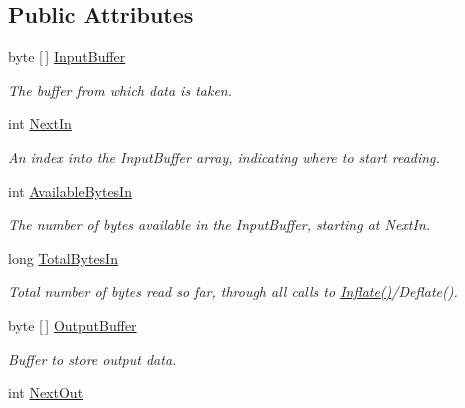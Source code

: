 \subsection*{Public Attributes}
\begin{DoxyCompactItemize}
\item 
byte \mbox{[}$\,$\mbox{]} \mbox{\hyperlink{class_super_tiled2_unity_1_1_ionic_1_1_zlib_1_1_zlib_codec_a402b3630c322f33762b0a5ac1e176eef}{Input\+Buffer}}
\begin{DoxyCompactList}\small\item\em The buffer from which data is taken. \end{DoxyCompactList}\item 
int \mbox{\hyperlink{class_super_tiled2_unity_1_1_ionic_1_1_zlib_1_1_zlib_codec_ab29880bc78b6c9968ebe9a89e90734c2}{Next\+In}}
\begin{DoxyCompactList}\small\item\em An index into the Input\+Buffer array, indicating where to start reading. \end{DoxyCompactList}\item 
int \mbox{\hyperlink{class_super_tiled2_unity_1_1_ionic_1_1_zlib_1_1_zlib_codec_adc3350c2298e0341dc75e7724de140f3}{Available\+Bytes\+In}}
\begin{DoxyCompactList}\small\item\em The number of bytes available in the Input\+Buffer, starting at Next\+In. \end{DoxyCompactList}\item 
long \mbox{\hyperlink{class_super_tiled2_unity_1_1_ionic_1_1_zlib_1_1_zlib_codec_a391c4ea8048d19b0784929372149a200}{Total\+Bytes\+In}}
\begin{DoxyCompactList}\small\item\em Total number of bytes read so far, through all calls to \mbox{\hyperlink{class_super_tiled2_unity_1_1_ionic_1_1_zlib_1_1_zlib_codec_a9586e5a25c06331824638439938ac8c8}{Inflate()}}/\+Deflate(). \end{DoxyCompactList}\item 
byte \mbox{[}$\,$\mbox{]} \mbox{\hyperlink{class_super_tiled2_unity_1_1_ionic_1_1_zlib_1_1_zlib_codec_aaee897c42c02cc7d967e13a8189de8a3}{Output\+Buffer}}
\begin{DoxyCompactList}\small\item\em Buffer to store output data. \end{DoxyCompactList}\item 
int \mbox{\hyperlink{class_super_tiled2_unity_1_1_ionic_1_1_zlib_1_1_zlib_codec_ad9ff05beba7eadf8937e071d3370ccc1}{Next\+Out}}

\end{DoxyCompactItemize}
